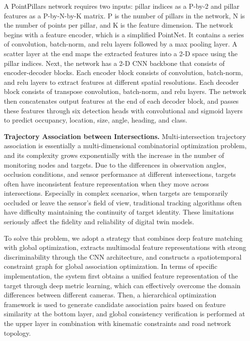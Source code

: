 \documentclass[journal,twoside,web]{ieeecolor}
\begin{document}
A PointPillars network requires two inputs: pillar indices as a P-by-2 and pillar features as a P-by-N-by-K matrix. P is the number of pillars in the network, N is the number of points per pillar, and K is the feature dimension.
The network begins with a feature encoder, which is a simplified PointNet. It contains a series of convolution, batch-norm, and relu layers followed by a max pooling layer. A scatter layer at the end maps the extracted features into a 2-D space using the pillar indices.
Next, the network has a 2-D CNN backbone that consists of encoder-decoder blocks. Each encoder block consists of convolution, batch-norm, and relu layers to extract features at different spatial resolutions. Each decoder block consists of transpose convolution, batch-norm, and relu layers.
The network then concatenates output features at the end of each decoder block, and passes these features through six detection heads with convolutional and sigmoid layers to predict occupancy, location, size, angle, heading, and class.

\textbf{Trajectory Association between Intersections.}
Multi-intersection trajectory association is essentially a multi-dimensional combinatorial optimization problem, and its complexity grows exponentially with the increase in the number of monitoring nodes and targets.
Due to the differences in observation angles, occlusion conditions, and sensor performance at different intersections, targets often have inconsistent feature representation when they move across intersections.
Especially in complex scenarios, when targets are temporarily occluded or leave the sensor's field of view, traditional tracking algorithms often have difficulty maintaining the continuity of target identity.
These limitations seriously affect the fidelity and reliability of digital twin models.

To solve this problem, we adopt a strategy that combines deep feature matching with global optimization, extracts multimodal feature representations with strong discriminability through the CNN architecture, and constructs a spatiotemporal constraint graph for global association optimization.
In terms of specific implementation, the system first obtains a unified feature representation of the target through deep metric learning, which can effectively overcome the domain differences between different cameras.
Then, a hierarchical optimization framework is used to generate candidate association pairs based on feature similarity at the bottom layer, and global consistency verification is performed at the upper layer in combination with kinematic constraints and road network topology.
\end{document}
